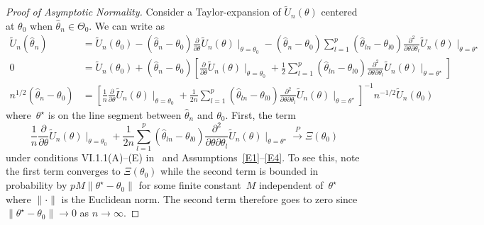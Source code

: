 \documentclass[11pt]{amsart}
\begin{document}
\begin{proof}[Proof of Asymptotic Normality]
Consider a Taylor-expansion of $\tilde U_n (\theta)$ centered at $\theta_0$ when $\hat \theta_n \in \Theta_0$.  We can write as
\begin{align*}
\tilde U_n (\hat \theta_n) &= \tilde U_n (\theta_0) -  (\hat \theta_n - \theta_0) \frac{\partial}{\partial \theta} \tilde U_n (\theta) \mid_{\theta=\theta_0} - (\hat \theta_n - \theta_0) \sum_{l=1}^p (\hat \theta_{ln} - \theta_{l0}) \frac{\partial^2}{\partial \theta \partial \theta_l} \tilde U_n (\theta) \mid_{\theta=\theta^\star} \\
0 &= \tilde U_n (\theta_0) + (\hat \theta_n - \theta_0) \left[ \frac{\partial}{\partial \theta} \tilde U_n (\theta) \mid_{\theta=\theta_0} + \frac{1}{2} \sum_{l=1}^p (\hat \theta_{ln} - \theta_{l0}) \frac{\partial^2}{\partial \theta \partial \theta_l} \tilde U_n (\theta) \mid_{\theta=\theta^\star} \right] \\
n^{1/2} (\hat \theta_n - \theta_0) &= \left[ \frac{1}{n} \frac{\partial}{\partial \theta} \tilde U_n (\theta) \mid_{\theta=\theta_0} + \frac{1}{2n} \sum_{l=1}^p (\hat \theta_{ln} - \theta_{l0}) \frac{\partial^2}{\partial \theta \partial \theta_l} \tilde U_n (\theta) \mid_{\theta=\theta^\star} \right]^{-1} n^{-1/2} \tilde U_n (\theta_0)
\end{align*}
where~$\theta^\star$ is on the line segment between $\hat \theta_n$ and $\theta_0$. First, the term
$$
\frac{1}{n} \frac{\partial}{\partial \theta} \tilde U_n (\theta) \mid_{\theta=\theta_0} + \frac{1}{2n} \sum_{l=1}^p (\hat \theta_{ln} - \theta_{l0}) \frac{\partial^2}{\partial \theta \partial \theta_l} \tilde U_n (\theta) \mid_{\theta=\theta^\star}
\overset{P}{\to} \Xi(\theta_0)
$$
under conditions VI.1.1(A)--(E) in~\cite{Andersen1993} and Assumptions~\ref{E1}--\ref{E4}.  To see this, note the first term converges to $\Xi(\theta_0)$ while the second term is bounded in probability by $p M \| \theta^\star - \theta_0 \|$ for some finite constant~$M$ independent of~$\theta^\star$ where $\| \cdot \|$ is the Euclidean norm.  The second term therefore goes to zero since $\| \theta^\star - \theta_0 \| \to 0$ as $n \to \infty$.


\end{proof}
\end{document}

